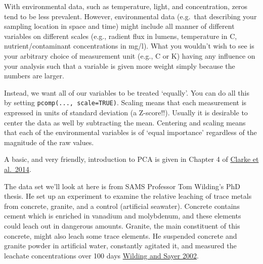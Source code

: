 \documentclass[
  11pt,
  a4paper,
]{book}
\begin{document}
With environmental data, such as temperature, light, and concentration, zeros tend to be less prevalent. However, environmental data (e.g.~that describing your sampling location in space and time) might include all manner of different variables on different scales (e.g., radient flux in lumens, temperature in C, nutrient/contaminant concentrations in mg/l). What you wouldn't wish to see is your arbitrary choice of measurement unit (e.g., C or K) having any influence on your analysis such that a variable is given more weight simply because the numbers are larger.

Instead, we want all of our variables to be treated `equally'. You can do all this by setting \texttt{pcomp(...,\ scale=TRUE)}. Scaling means that each measurement is expressed in units of standard deviation (a Z-score!!). Usually it is desirable to center the data as well by subtracting the mean. Centering and scaling means that each of the environmental variables is of `equal importance' regardless of the magnitude of the raw values.

A basic, and very friendly, introduction to PCA is given in Chapter 4 of \href{https://www.primer-e.com/wp-content/uploads/2018/10/Change-in-Marine-Communities-3rd-ed.pdf}{Clarke et al.~2014}.

The data set we'll look at here is from SAMS Professor Tom Wilding's PhD thesis. He set up an experiment to examine the relative leaching of trace metals from concrete, granite, and a control (artificial seawater). Concrete contains cement which is enriched in vanadium and molybdenum, and these elements could leach out in dangerous amounts. Granite, the main constituent of this concrete, might also leach some trace elements. He suspended concrete and granite powder in artificial water, constantly agitated it, and measured the leachate concentrations over 100 days \href{https://doi.org/10.1006/jmsc.2002.1267}{Wilding and Sayer 2002}.
\end{document}
